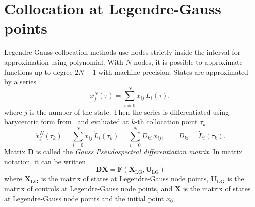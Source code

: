 \section{Collocation at Legendre-Gauss points}

Legendre-Gauss collocation methods use nodes strictly inside the interval for approximation using polynomial.
With $N$ nodes, it is possible to approximate functions up to degree $2N-1$ with machine precision.
States are approximated by a series
\begin{equation}
    x^N_j(\tau) = \sum_{i=0}^{N} x_{ij}\, L_i(\tau),
\end{equation}
where $j$ is the number of the state.
Then the series is differentiated using barycentric form from~\cite[p.513]{berrutBarycentricLagrangeInterpolation2004} and evaluated at $k$-th collocation point $\tau_k$
\begin{equation}
    \dot{x}^N_j(\tau_k) = \sum_{i=0}^{N} x_{ij}\, \dot{L}_i(\tau_k) = \sum_{i=0}^{N} D_{ki}\, x_{ij}, \qquad D_{ki} = \dot{L}_i(\tau_k).
\end{equation}
Matrix $\mathbf{D}$ is called the \emph{Gauss Pseudospectral differentiation matrix}. In matrix notation, it can be written
\begin{equation}
\mathbf{DX} = \mathbf{F(X_{\mathrm{LG}}, U_{\mathrm{LG}})    }
\end{equation}
where $\mathbf{X_{LG}}$ is the matrix of states at Legendre-Gauss node points, $\mathbf{U_{LG}}$ is the matrix of controls at Legendre-Gauss node points, and $\mathbf{X}$ is the matrix of states at Legendre-Gauss node points and the initial point $x_0$

